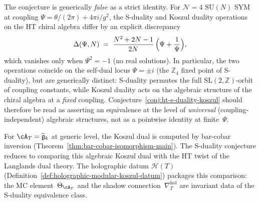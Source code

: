 \begin{remark}
\label{rem:ht-s-duality-discrepancy}
The conjecture is generically \emph{false} as a strict identity.
For $\mathcal{N}=4$ $\mathrm{SU}(N)$ SYM at coupling $\Psi = \theta/(2\pi) + 4\pi i/g^2$,
the S-duality and Koszul duality operations on the HT chiral algebra
differ by an explicit discrepancy
\[
 \Delta(\Psi, N)
 \;=\;
 \frac{N^2 + 2N - 1}{2N}\,\Bigl(\Psi + \frac{1}{\Psi}\Bigr),
\]
which vanishes only when $\Psi^2 = -1$ (no real solutions).
In particular, the two operations coincide on the self-dual locus
$\Psi = \pm i$ (the $\mathbb{Z}_4$ fixed point of S-duality),
but are generically distinct: S-duality permutes the full
$\mathrm{SL}(2,\mathbb{Z})$-orbit of coupling constants,
while Koszul duality acts on the algebraic structure of the
chiral algebra at a \emph{fixed} coupling.
Conjecture~\ref{conj:ht-s-duality-koszul} should therefore
be read as asserting an equivalence at the level of
\emph{universal} (coupling-independent) algebraic structures,
not as a pointwise identity at finite~$\Psi$.
\end{remark}

\begin{remark}
\label{rem:ht-s-duality-proved}
For $\cA_T = \widehat{\mathfrak{g}}_k$ at generic level, the Koszul
dual is computed by bar-cobar inversion
(Theorem~\ref{thm:bar-cobar-isomorphism-main}). The S-duality
conjecture reduces to comparing this algebraic Koszul dual with the
HT twist of the Langlands dual theory. The holographic datum
$\mathcal{H}(T)$
(Definition~\ref{def:holographic-modular-koszul-datum}) packages
this comparison: the MC element~$\Theta_{\cA_T}$ and the shadow
connection~$\nabla^{\mathrm{hol}}_T$ are invariant data of the
S-duality equivalence class.
\end{remark}


